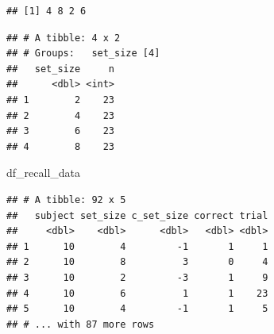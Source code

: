 \documentclass[12pt,ignorenonframetext,aspectratio=169]{beamer}
\newenvironment{Shaded}{\begin{snugshade}}{\end{snugshade}}
\newcommand{\CommentTok}[1]{\textcolor[rgb]{0.56,0.35,0.01}{\textit{#1}}}
\newcommand{\KeywordTok}[1]{\textcolor[rgb]{0.13,0.29,0.53}{\textbf{#1}}}
\newcommand{\NormalTok}[1]{#1}
\newcommand{\OperatorTok}[1]{\textcolor[rgb]{0.81,0.36,0.00}{\textbf{#1}}}
\newcommand{\StringTok}[1]{\textcolor[rgb]{0.31,0.60,0.02}{#1}}
\begin{document}
\begin{frame}[fragile]

\scriptsize

\begin{Shaded}
\end{Shaded}

\begin{verbatim}
## [1] 4 8 2 6
\end{verbatim}

\begin{Shaded}
\end{Shaded}

\begin{verbatim}
## # A tibble: 4 x 2
## # Groups:   set_size [4]
##   set_size     n
##      <dbl> <int>
## 1        2    23
## 2        4    23
## 3        6    23
## 4        8    23
\end{verbatim}

\normalsize

\end{frame}

\begin{frame}[fragile]

\scriptsize

\begin{Shaded}
\begin{Highlighting}[]
\NormalTok{df_recall_data}
\end{Highlighting}
\end{Shaded}

\begin{verbatim}
## # A tibble: 92 x 5
##   subject set_size c_set_size correct trial
##     <dbl>    <dbl>      <dbl>   <dbl> <dbl>
## 1      10        4         -1       1     1
## 2      10        8          3       0     4
## 3      10        2         -3       1     9
## 4      10        6          1       1    23
## 5      10        4         -1       1     5
## # ... with 87 more rows
\end{verbatim}

\normalsize

\end{frame}
\end{document}
